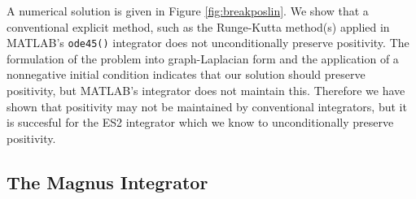 A numerical solution is given in Figure \ref{fig:breakposlin}.
We show that a conventional explicit method, such as the Runge-Kutta method(s) applied in MATLAB's \texttt{ode45()} integrator does not unconditionally preserve positivity.
The formulation of the problem into graph-Laplacian form and the application of a nonnegative initial condition indicates that our solution should preserve positivity, but MATLAB's integrator does not maintain this.
Therefore we have shown that positivity may not be maintained by conventional integrators,
but it is succesful for the ES2 integrator which we know to unconditionally preserve positivity.

\subsection{The Magnus Integrator}

